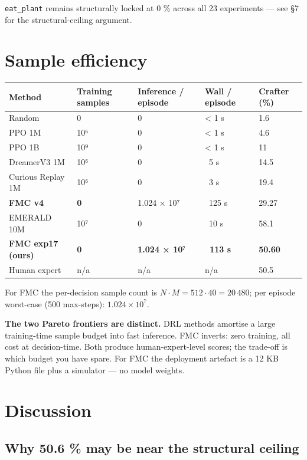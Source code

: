 \documentclass[11pt,letterpaper]{article}
\begin{document}
\texttt{eat\_plant} remains structurally locked at 0 \% across all 23
experiments — see §7 for the structural-ceiling argument.



\section{Sample efficiency}

\begin{tabular}{l l l l l}
\toprule
Method & Training samples & Inference / episode & Wall / episode & Crafter (\%) \\
\midrule
Random & 0 & 0 & < 1 s & 1.6 \\
PPO 1M & 10⁶ & 0 & < 1 s & 4.6 \\
PPO 1B & 10⁹ & 0 & < 1 s & 11 \\
DreamerV3 1M & 10⁶ & 0 & ~5 s & 14.5 \\
Curious Replay 1M & 10⁶ & 0 & ~3 s & 19.4 \\
\textbf{FMC v4} & \textbf{0} & 1.024 × 10⁷ & ~125 s & 29.27 \\
EMERALD 10M & 10⁷ & 0 & ~10 s & 58.1 \\
\textbf{FMC exp17 (ours)} & \textbf{0} & \textbf{1.024 × 10⁷} & \textbf{~113 s} & \textbf{50.60} \\
Human expert & n/a & n/a & n/a & 50.5 \\
\bottomrule
\end{tabular}

For FMC the per-decision sample count is $N \cdot M = 512 \cdot 40 =
20\,480$; per episode worst-case (500 max-steps): $1.024 \times 10^7$.

\textbf{The two Pareto frontiers are distinct.} DRL methods amortise a
large training-time sample budget into fast inference. FMC inverts:
zero training, all cost at decision-time. Both produce
human-expert-level scores; the trade-off is which budget you have
spare. For FMC the deployment artefact is a 12 KB Python file plus
a simulator — no model weights.



\section{Discussion}

\subsection{Why 50.6 \% may be near the structural ceiling}
\end{document}
